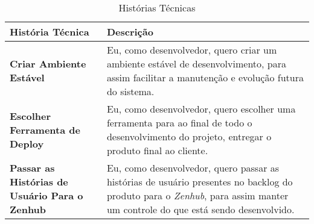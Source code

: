 \begin{table}[H]
	\begin{tabular}{|p{5.0cm}|p{10.0cm}|} 
	\hline
	\textbf{História Técnica} & \textbf{Descrição} \\ \hline
	\textbf{Criar Ambiente Estável} & Eu, como desenvolvedor, quero criar um ambiente estável de desenvolvimento, para assim facilitar a manutenção e evolução futura do sistema. \\ \hline
	\textbf{Escolher Ferramenta de Deploy} & Eu, como desenvolvedor, quero escolher uma ferramenta para ao final de todo o desenvolvimento do projeto, entregar o produto final ao cliente. \\ \hline
	\textbf{Passar as Histórias de Usuário Para o Zenhub} & Eu, como desenvolvedor, quero passar as histórias de usuário presentes no backlog do produto para o \textit{Zenhub}, para assim manter um controle do que está sendo desenvolvido. \\ \hline
	\end{tabular}
	 \caption{Histórias Técnicas}
	 \label{tab:historias_tecnicas}
\end{table}